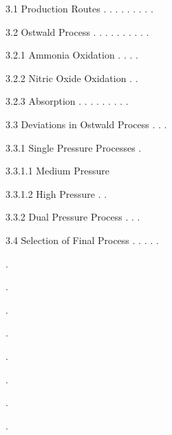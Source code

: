 \documentclass[a4paper,portrait,12pt]{article}
\begin{document}
\begin{flushleft}
3.1 Production Routes . . . . . . . . .
\end{flushleft}


\begin{flushleft}
3.2 Ostwald Process . . . . . . . . . .
\end{flushleft}


\begin{flushleft}
3.2.1 Ammonia Oxidation . . . .
\end{flushleft}


\begin{flushleft}
3.2.2 Nitric Oxide Oxidation . .
\end{flushleft}


\begin{flushleft}
3.2.3 Absorption . . . . . . . . .
\end{flushleft}


\begin{flushleft}
3.3 Deviations in Ostwald Process . . .
\end{flushleft}


\begin{flushleft}
3.3.1 Single Pressure Processes .
\end{flushleft}


\begin{flushleft}
3.3.1.1 Medium Pressure
\end{flushleft}


\begin{flushleft}
3.3.1.2 High Pressure . .
\end{flushleft}


\begin{flushleft}
3.3.2 Dual Pressure Process . . .
\end{flushleft}


\begin{flushleft}
3.4 Selection of Final Process . . . . .
\end{flushleft}





.


.


.


.


.





.


.


.
\end{document}
